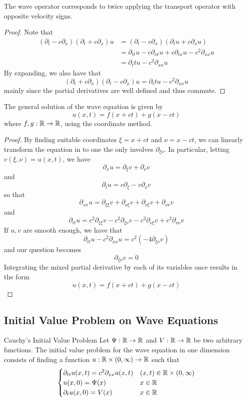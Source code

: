 \documentclass[a4paper]{article}
\begin{document}
\begin{prp}{}{} The wave operator corresponds to twice applying the transport operator with opposite velocity signs.  \tcbline
\begin{proof}
Note that 
\begin{align*}
(\partial_t-c\partial_x)(\partial_t+c\partial_x)u&=(\partial_t-c\partial_x)(\partial_tu+c\partial_xu)\\
&=\partial_{tt}u-c\partial_{xt}u+c\partial_{tx}u-c^2\partial_{xx}u\\
&=\partial_ttu-c^2\partial_{xx}u
\end{align*}
By expanding, we also have that $$(\partial_t+c\partial_x)(\partial_t-c\partial_x)u=\partial_ttu-c^2\partial_{xx}u$$ mainly since the partial derivatives are well defined and thus commute. 
\end{proof}
\end{prp}

\begin{thm}{}{} The general solution of the wave equation is given by $$u(x,t)=f(x+ct)+g(x-ct)$$ where $f,g:\mathbb{R}\to\mathbb{R}$, using the coordinate method. \tcbline
\begin{proof} By finding suitable coordinates $\xi=x+ct$ and $\nu=x-ct$, we can linearly transform the equation in to one the only involves $\partial_{\xi\nu}$. In particular, letting $v(\xi,\nu)=u(x,t)$, we have $$\partial_xu=\partial_\xi v+\partial_\nu v$$ and $$\partial_tu=c\partial_\xi-v\partial_\nu v$$ so that $$\partial_{xx}u=\partial_{\xi\xi}v+\partial_{\nu\xi}v+\partial_{\nu\xi}v+\partial_{\nu\nu}v$$ and $$\partial_{tt}u=c^2\partial_{\xi\xi}v-c^2\partial_{\xi\nu}v-c^2\partial_{\nu\xi}v+c^2\partial_{\nu\nu}v$$ If $u,v$ are smooth enough, we have that $$\partial_{tt}u-c^2\partial_{xx}u=c^2(-4\partial_{\xi\nu}v)$$ and our question becomes $$\partial_{\xi\nu}v=0$$ Integrating the mixed partial derivative by each of its variables once results in the form $$u(x,t)=f(x+ct)+g(x-ct)$$
\end{proof}
\end{thm}

\subsection{Initial Value Problem on Wave Equations}
\begin{defn}{Cauchy's Initial Value Problem}{} Let $\Psi:\mathbb{R}\to\mathbb{R}$ and $V:\mathbb{R}\to\mathbb{R}$ be two arbitrary functions. The initial value problem for the wave equation in one dimension consists of finding a function $u:\mathbb{R}\times(0,\infty)\to\mathbb{R}$ such that $$\begin{cases}
\partial_{tt}u(x,t)=c^2\partial_{xx}u(x,t) & (x,t)\in\mathbb{R}\times(0,\infty)\\
u(x,0)=\Psi(x) & x\in\mathbb{R}\\
\partial_tu(x,0)=V(x) & x\in\mathbb{R}
\end{cases}$$
\end{defn}
\end{document}
